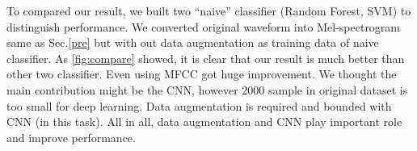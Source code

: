To compared our result, we built two ``naive'' classifier (Random Forest, SVM) to distinguish performance. We converted original waveform into Mel-spectrogram same as Sec.\ref{pre} but with out data augmentation as training data of naive classifier.
As \ref{fig:compare} showed, it is clear that our result is much better than other two classifier. Even using MFCC got huge improvement. We thought the main contribution might be the CNN, however 2000 sample in original dataset is too small for deep learning. Data augmentation is required and bounded with CNN (in this task). All in all, data augmentation and CNN play important role and improve performance.
